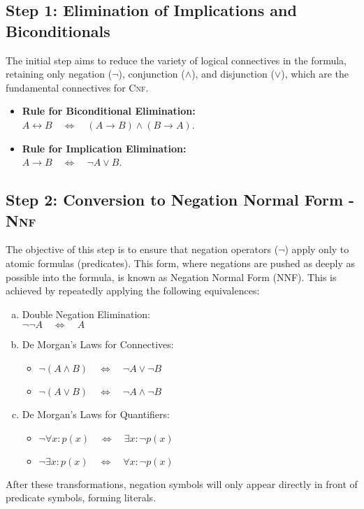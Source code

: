 \subsection{Step 1: Elimination of Implications and Biconditionals}
The initial step aims to reduce the variety of logical connectives in the formula, retaining only negation
($\neg$), conjunction ($\land$), and disjunction ($\lor$), which are the fundamental connectives for
\textsc{Cnf}. 
\begin{itemize}
\item \textbf{Rule for Biconditional Elimination:}
      \\[0.2cm]
      \hspace*{1.3cm}
      $A \leftrightarrow B \quad\Leftrightarrow\quad (A \rightarrow B) \land (B \rightarrow A)$.
\item \textbf{Rule for Implication Elimination:} 
      \\[0.2cm]
      \hspace*{1.3cm}
      $A \rightarrow B \quad\Leftrightarrow\quad \neg A \lor B$.
\end{itemize}

\subsection{Step 2: Conversion to Negation Normal Form - \textsc{Nnf}}
The objective of this step is to ensure that negation operators ($\neg$) apply only to atomic formulas
(predicates). This form, where negations are pushed as deeply as possible into the formula, is known as
Negation Normal Form (NNF). This is achieved by repeatedly applying the following equivalences: 
\begin{enumerate}[(a)]
\item Double Negation Elimination:
      \\[0.2cm]
      \hspace*{1.3cm}
      $\neg \neg A \quad\Leftrightarrow\quad A$
\item De Morgan's Laws for Connectives:
      \begin{itemize}
        \item $\neg (A \land B) \quad\Leftrightarrow\quad \neg A \lor \neg B$
        \item $\neg (A \lor B)  \quad\Leftrightarrow\quad \neg A \land \neg B$
      \end{itemize}
\item De Morgan's Laws for Quantifiers:
      \begin{itemize}
        \item $\neg \forall x: p(x) \quad\Leftrightarrow\quad \exists x: \neg p(x)$
        \item $\neg \exists x: p(x) \quad\Leftrightarrow\quad \forall x: \neg p(x)$
      \end{itemize}
\end{enumerate}
After these transformations, negation symbols will only appear directly in front of predicate symbols, forming literals.


